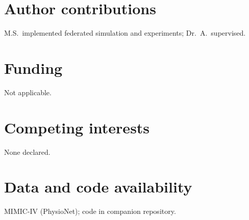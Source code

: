 \section*{Author contributions}
M.S.\ implemented federated simulation and experiments; Dr.\ A.\ supervised.

\section*{Funding}
Not applicable.

\section*{Competing interests}
None declared.

\section*{Data and code availability}
MIMIC-IV (PhysioNet); code in companion repository.
